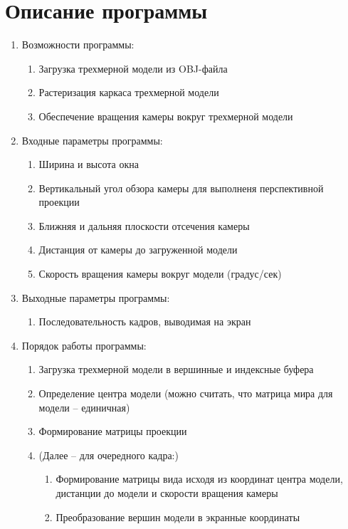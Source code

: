 \documentclass[14pt,a4paper,report]{report}
\begin{document}
\section{Описание программы}
\begin{enumerate}
\item Возможности программы:

\begin{enumerate}
\item Загрузка трехмерной модели из OBJ-файла
\item Растеризация каркаса трехмерной модели
\item Обеспечение вращения камеры вокруг трехмерной модели
\end{enumerate}

\item Входные параметры программы:

\begin{enumerate}
\item Ширина и высота окна
\item Вертикальный угол обзора камеры для выполненя перспективной проекции
\item Ближняя и дальняя плоскости отсечения камеры
\item Дистанция от камеры до загруженной модели
\item Скорость вращения камеры вокруг модели (градус/сек)
\end{enumerate}

\item Выходные параметры программы:

\begin{enumerate}
\item Последовательность кадров, выводимая на экран
\end{enumerate}
\item Порядок работы программы:
\begin{enumerate}
\item Загрузка трехмерной модели в вершинные и индексные буфера
\item Определение центра модели (можно считать, что матрица мира для модели – единичная)
\item Формирование матрицы проекции
\item (Далее – для очередного кадра:)
\begin{enumerate}
\item Формирование матрицы вида исходя из координат центра модели, дистанции до модели и скорости вращения камеры
\item Преобразование вершин модели в экранные координаты 
\end{enumerate}
\end{enumerate}

\end{enumerate}
\clearpage
\end{document}
